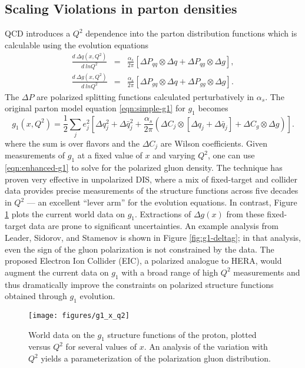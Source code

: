 \subsection{Scaling Violations in parton densities}

QCD introduces a \(Q^2\) dependence into the parton distribution functions which is calculable using the evolution equations
%
\begin{eqnarray}
  \frac{d~\Delta q(x,Q^2)}{d~ln Q^2} &=& \frac{\alpha_s}{2 \pi} \left[ \Delta P_{qq} \otimes \Delta q + \Delta P_{qg} \otimes \Delta g \right], \nonumber \\
  \frac{d~\Delta g(x,Q^2)}{d~ln Q^2} &=& \frac{\alpha_s}{2 \pi} \left[ \Delta P_{gq} \otimes \Delta q + \Delta P_{gg} \otimes \Delta g \right].
\end{eqnarray}
%
The \(\Delta P\) are polarized splitting functions calculated perturbatively in \(\alpha_s\).  The original parton model equation \ref{eqn:simple-g1} for \(g_1\) becomes
%
\begin{equation}
  g_1(x, Q^2) = \frac{1}{2} \sum_{j} e_j^2 \left[\Delta q_j^2 + \Delta \bar{q}_j^2 + \frac{\alpha_s}{2 \pi} \left(\Delta C_j \otimes \left[\Delta q_j + \Delta \bar{q}_j\right] + \Delta C_g \otimes \Delta g\right)\right].
  \label{eqn:enhanced-g1}
\end{equation}
%
where the sum is over flavors and the \(\Delta C_j\) are Wilson coefficients. Given measurements of \(g_1\) at a fixed value of \(x\) and varying \(Q^2\), one can use \ref{eqn:enhanced-g1} to solve for the polarized gluon density. The  technique has proven very effective in unpolarized DIS, where a mix of fixed-target and collider data provides precise measurements of the structure functions across five decades in \(Q^2\) --- an excellent ``lever arm'' for the evolution equations.  In contrast, Figure \ref{fig:g1-versus-q2} plots the current world data on \(g_1\).  Extractions of \(\Delta g(x)\) from these fixed-target data are prone to significant uncertainties.  An example analysis from Leader, Sidorov, and Stamenov is shown in Figure \ref{fig:g1-deltag}; in that analysis, even the sign of the gluon polarization is not constrained by the data. The proposed Electron Ion Collider (EIC), a polarized analogue to HERA, would augment the current data on \(g_1\) with a broad range of high \(Q^2\) measurements and thus dramatically improve the constraints on polarized structure functions obtained through \(g_1\) evolution.

\begin{figure}
  \centering
  \texttt{[image: figures/g1\_x\_q2]}
  \caption{World data on the $g_1$ structure functions of the proton, plotted
  versus $Q^2$ for several values of $x$. An analysis of the variation with
  $Q^2$ yields a parameterization of the polarization gluon distribution.}
  \label{fig:g1-versus-q2}
\end{figure}


